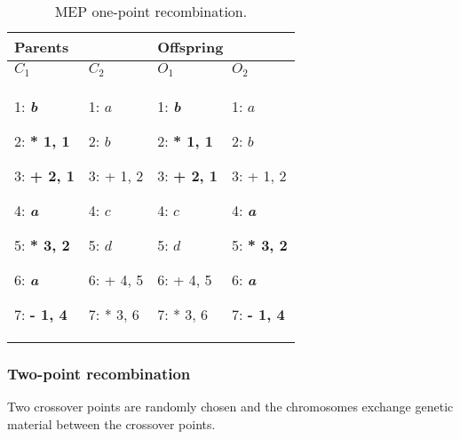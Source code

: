 \documentclass [11pt]{article}
\begin{document}
\begin{table}[htbp]
\begin{center}
\caption{MEP one-point recombination.}
\begin{tabular}
{p{55pt}p{49pt}p{49pt}p{53pt}}
\hline
\multicolumn{2}{p{104pt}}{Parents } & 
\multicolumn{2}{p{103pt}}{Offspring}  \\
\hline
$C_{1}$& 
$C_{2}$& 
$O_{1}$& 
$O_{2}$ \\
\hline
1: \textbf{\textit{b}} \par 2: \textbf{* 1, 1} \par 3: \textbf{+ 2, 1} \par 4: \textbf{\textit{a}} \par 5: \textbf{* 3, 2} \par 6: \textbf{\textit{a}} \par 7: \textbf{- 1, 4}& 
1: $a$ \par 2: $b$ \par 3: + 1, 2 \par 4: $c$ \par 5: $d$ \par 6: + 4, 5 \par 7: * 3, 6& 
1: \textbf{\textit{b}} \par 2: \textbf{* 1, 1} \par 3: \textbf{+ 2, 1} \par 4: $c$ \par 5: $d$ \par 6: + 4, 5 \par 7: * 3, 6& 
1: $a$ \par 2: $b$ \par 3: + 1, 2 \par 4: \textbf{\textit{a}} \par 5: \textbf{* 3, 2} \par 6: \textbf{\textit{a}} \par 7: \textbf{- 1, 4} \\
\hline
\end{tabular}
\end{center}
\label{mep_one_cut_point}
\end{table}


\subsubsection{Two-point recombination}

Two crossover points are randomly chosen and the chromosomes exchange 
genetic material between the crossover points.\\
\end{document}
